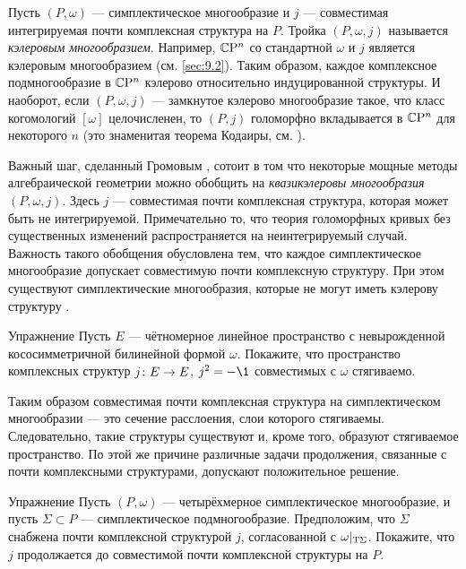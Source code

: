 Пусть $(P, \omega)$ — симплектическое многообразие и $j$ —
совместимая интегрируемая почти комплексная структура на $P$.
Тройка $(P, \omega, j)$ называется \emph{кэлеровым многообразием}.  
Например, $\mathbb{C}\mathrm{P}^n$ со стандартной $\omega$ и $j$ является кэлеровым
многообразием (см. \ref{sec:9.2}). 
Таким образом, каждое комплексное подмногообразие в $\mathbb{C}\mathrm{P}^n$ кэлерово
относительно индуцированной структуры. 
И наоборот, если $(P, \omega, j)$ — замкнутое кэлерово многообразие
такое, что класс когомологий $[\omega]$ целочисленен, то $(P, j)$
голоморфно вкладывается в $\mathbb{C}\mathrm{P}^n$ для некоторого $n$ (это знаменитая
теорема Кодаиры, см. \cite{GH}). 

Важный шаг, сделанный Громовым \cite{G1}, сотоит в том
что некоторые мощные методы алгебраической геометрии можно обобщить на
\emph{квазикэлеровы многообразия}
$(P, \omega, j)$. 
Здесь $j$ — совместимая почти комплексная структура, которая может
быть не интегрируемой. 
Примечательно то, что теория голоморфных кривых без существенных
изменений распространяется на неинтегрируемый случай. 
Важность такого обобщения обусловлена тем, что
каждое симплектическое многообразие допускает совместимую почти комплексную структуру.
При этом существуют симплектические многообразия, которые не могут иметь кэлерову структуру \cite{MS}.

\begin{ex}[\cite{MS}]{Упражнение}\label{10.2.B}
Пусть $E$ — чётномерное линейное пространство с невырожденной
кососимметричной билинейной формой $\omega$. 
Покажите, что пространство комплексных структур $j\: E \z\to E$, $j^2
= -\1$ совместимых с $\omega$ стягиваемо. 
\end{ex}

Таким образом совместимая почти комплексная структура на
симплектическом многообразии — это сечение расслоения, слои которого
стягиваемы. 
Следовательно, такие структуры существуют и, кроме того, образуют
стягиваемое пространство. 
По этой же причине различные задачи продолжения, связанные с почти
комплексными структурами, допускают положительное решение. 

\begin{ex}{Упражнение}\label{10.2.C}
Пусть $(P, \omega)$ — четырёхмерное симплектическое многообразие, и
пусть $\Sigma \subset P$ — симплектическое подмногообразие. 
Предположим, что $\Sigma$ снабжена почти комплексной структурой $j$,
согласованной с $\omega|_{\mathrm{T} \Sigma}$. 
Покажите, что $j$ продолжается до совместимой почти комплексной
структуры на $P$. 
\end{ex}


